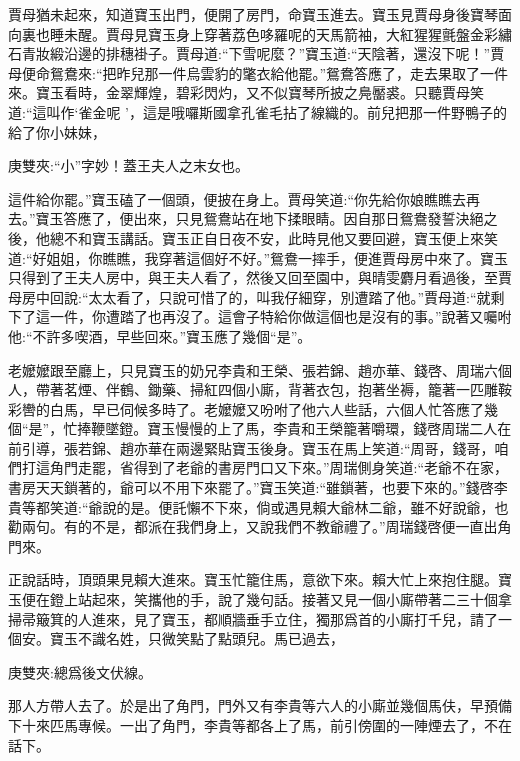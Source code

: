 \begin{parag}
    賈母猶未起來，知道寶玉出門，便開了房門，命寶玉進去。寶玉見賈母身後寶琴面向裏也睡未醒。賈母見寶玉身上穿著荔色哆羅呢的天馬箭袖，大紅猩猩氈盤金彩繡石青妝緞沿邊的排穗褂子。賈母道:“下雪呢麼？”寶玉道:“天陰著，還沒下呢！”賈母便命鴛鴦來:“把昨兒那一件烏雲豹的氅衣給他罷。”鴛鴦答應了，走去果取了一件來。寶玉看時，金翠輝煌，碧彩閃灼，又不似寶琴所披之鳧靨裘。只聽賈母笑道:“這叫作‘雀金呢 ’，這是哦囉斯國拿孔雀毛拈了線織的。前兒把那一件野鴨子的給了你小妹妹，\begin{note}庚雙夾:“小”字妙！蓋王夫人之末女也。\end{note}這件給你罷。”寶玉磕了一個頭，便披在身上。賈母笑道:“你先給你娘瞧瞧去再去。”寶玉答應了，便出來，只見鴛鴦站在地下揉眼睛。因自那日鴛鴦發誓決絕之後，他總不和寶玉講話。寶玉正自日夜不安，此時見他又要回避，寶玉便上來笑道:“好姐姐，你瞧瞧，我穿著這個好不好。”鴛鴦一摔手，便進賈母房中來了。寶玉只得到了王夫人房中，與王夫人看了，然後又回至園中，與晴雯麝月看過後，至賈母房中回說:“太太看了，只說可惜了的，叫我仔細穿，別遭踏了他。”賈母道:“就剩下了這一件，你遭踏了也再沒了。這會子特給你做這個也是沒有的事。”說著又囑咐他:“不許多喫酒，早些回來。”寶玉應了幾個“是”。
\end{parag}


\begin{parag}
    老嬤嬤跟至廳上，只見寶玉的奶兄李貴和王榮、張若錦、趙亦華、錢啓、周瑞六個人，帶著茗煙、伴鶴、鋤藥、掃紅四個小廝，背著衣包，抱著坐褥，籠著一匹雕鞍彩轡的白馬，早已伺候多時了。老嬤嬤又吩咐了他六人些話，六個人忙答應了幾個“是”，忙捧鞭墜鐙。寶玉慢慢的上了馬，李貴和王榮籠著嚼環，錢啓周瑞二人在前引導，張若錦、趙亦華在兩邊緊貼寶玉後身。寶玉在馬上笑道:“周哥，錢哥，咱們打這角門走罷，省得到了老爺的書房門口又下來。”周瑞側身笑道:“老爺不在家，書房天天鎖著的，爺可以不用下來罷了。”寶玉笑道:“雖鎖著，也要下來的。”錢啓李貴等都笑道:“爺說的是。便託懶不下來，倘或遇見賴大爺林二爺，雖不好說爺，也勸兩句。有的不是，都派在我們身上，又說我們不教爺禮了。”周瑞錢啓便一直出角門來。
\end{parag}


\begin{parag}
    正說話時，頂頭果見賴大進來。寶玉忙籠住馬，意欲下來。賴大忙上來抱住腿。寶玉便在鐙上站起來，笑攜他的手，說了幾句話。接著又見一個小廝帶著二三十個拿掃帚簸箕的人進來，見了寶玉，都順牆垂手立住，獨那爲首的小廝打千兒，請了一個安。寶玉不識名姓，只微笑點了點頭兒。馬已過去，\begin{note}庚雙夾:總爲後文伏線。\end{note}那人方帶人去了。於是出了角門，門外又有李貴等六人的小廝並幾個馬伕，早預備下十來匹馬專候。一出了角門，李貴等都各上了馬，前引傍圍的一陣煙去了，不在話下。
\end{parag}



